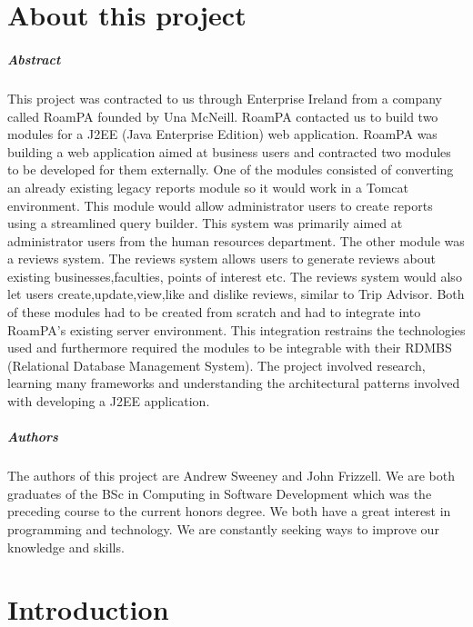 
\chapter*{About this project}
\paragraph{Abstract}

This project was contracted to us through Enterprise Ireland from a company called RoamPA founded by Una McNeill. RoamPA contacted us to build two modules for a J2EE (Java Enterprise Edition) web application. RoamPA was building a web application aimed at business users and contracted two modules to be developed for them externally. One of the modules consisted of converting an already existing legacy reports module so it would work in a Tomcat environment. This module would allow administrator users to create reports using a streamlined query builder. This system was primarily aimed at administrator users from the human resources department. The other module 
was a reviews system. The reviews system allows users to generate reviews about existing businesses,faculties, points of interest etc. The reviews system would also let users create,update,view,like and dislike reviews, similar to Trip Advisor. Both of these modules had to be created from scratch and had to integrate into RoamPA's existing server environment. This integration restrains the technologies used and furthermore required the modules to be integrable with their RDMBS (Relational Database Management System). The project involved research, learning many frameworks and understanding the architectural patterns involved with developing a J2EE application.

\paragraph{Authors}

The authors of this project are Andrew Sweeney and John Frizzell. We are both graduates of the BSc in Computing in Software Development which was the preceding course to the current honors degree. We both have a great interest in programming and technology. We are constantly seeking ways to improve our knowledge and skills.


\chapter{Introduction}

